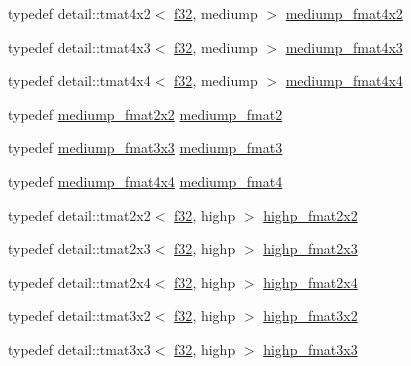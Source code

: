 \begin{CompactItemize}
\item 
typedef detail::tmat4x2$<$ \hyperlink{group__gtc__type__precision_g0ec999b57f5330d9021256e96038df04}{f32}, mediump $>$ \hyperlink{group__gtc__type__precision_g09a2851d38fe3cf52735a1d26199bdcc}{mediump\_\-fmat4x2}
\item 
typedef detail::tmat4x3$<$ \hyperlink{group__gtc__type__precision_g0ec999b57f5330d9021256e96038df04}{f32}, mediump $>$ \hyperlink{group__gtc__type__precision_g5e5de428d1e1da2c593a6245d92dd8c0}{mediump\_\-fmat4x3}
\item 
typedef detail::tmat4x4$<$ \hyperlink{group__gtc__type__precision_g0ec999b57f5330d9021256e96038df04}{f32}, mediump $>$ \hyperlink{group__gtc__type__precision_g7f4ae9d05ca94005a0b7d8e3c59943cd}{mediump\_\-fmat4x4}
\item 
typedef \hyperlink{group__gtc__type__precision_ge9af1d96efbaeeb5c5edd9c7b0a24fa5}{mediump\_\-fmat2x2} \hyperlink{group__gtc__type__precision_g5b9de77ef7403ffc972700219eca5450}{mediump\_\-fmat2}
\item 
typedef \hyperlink{group__gtc__type__precision_ga7f015dd5b962a658178bb881d4620cc}{mediump\_\-fmat3x3} \hyperlink{group__gtc__type__precision_g85f2267401434ea8c5463af040f0760c}{mediump\_\-fmat3}
\item 
typedef \hyperlink{group__gtc__type__precision_g7f4ae9d05ca94005a0b7d8e3c59943cd}{mediump\_\-fmat4x4} \hyperlink{group__gtc__type__precision_g6cd3ae1f3509b79061edcc83564769d4}{mediump\_\-fmat4}
\item 
typedef detail::tmat2x2$<$ \hyperlink{group__gtc__type__precision_g0ec999b57f5330d9021256e96038df04}{f32}, highp $>$ \hyperlink{group__gtc__type__precision_geb76f1230ecfd4c80635d3c618405e31}{highp\_\-fmat2x2}
\item 
typedef detail::tmat2x3$<$ \hyperlink{group__gtc__type__precision_g0ec999b57f5330d9021256e96038df04}{f32}, highp $>$ \hyperlink{group__gtc__type__precision_g53c126d1650b460bc7496a6fd5e5e764}{highp\_\-fmat2x3}
\item 
typedef detail::tmat2x4$<$ \hyperlink{group__gtc__type__precision_g0ec999b57f5330d9021256e96038df04}{f32}, highp $>$ \hyperlink{group__gtc__type__precision_g5df8430c47272adc901ef224d85a9c4d}{highp\_\-fmat2x4}
\item 
typedef detail::tmat3x2$<$ \hyperlink{group__gtc__type__precision_g0ec999b57f5330d9021256e96038df04}{f32}, highp $>$ \hyperlink{group__gtc__type__precision_gd5c083691eb15539fd81e27e1dc6b813}{highp\_\-fmat3x2}
\item 
typedef detail::tmat3x3$<$ \hyperlink{group__gtc__type__precision_g0ec999b57f5330d9021256e96038df04}{f32}, highp $>$ \hyperlink{group__gtc__type__precision_gf1d697243b1de74a5769c49e68b1e2a6}{highp\_\-fmat3x3}

\end{CompactItemize}
